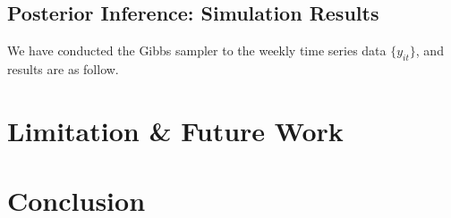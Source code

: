 \documentclass[11pt,a4paper]{article}
\begin{document}
\subsection{Posterior Inference: Simulation Results}
We have conducted the Gibbs sampler to the weekly time series data $\{y_{it} \}$, and results are as follow.
\section{Limitation \& Future Work}
\section{Conclusion}
\newpage


\end{document}
